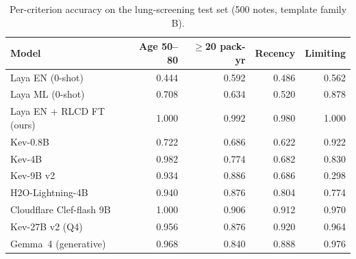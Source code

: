 \begin{table}[t]\centering\small
\caption{Per-criterion accuracy on the lung-screening test set (500 notes, template family B).}\label{tab:crit}
\begin{tabular}{lrrrr}\toprule Model & Age 50--80 & $\geq$20 pack-yr & Recency & Limiting \\ \midrule
Laya EN (0-shot) & 0.444 & 0.592 & 0.486 & 0.562 \\
Laya ML (0-shot) & 0.708 & 0.634 & 0.520 & 0.878 \\
Laya EN + RLCD FT (ours) & 1.000 & 0.992 & 0.980 & 1.000 \\
Kev-0.8B & 0.722 & 0.686 & 0.622 & 0.922 \\
Kev-4B & 0.982 & 0.774 & 0.682 & 0.830 \\
Kev-9B v2 & 0.934 & 0.886 & 0.686 & 0.298 \\
H2O-Lightning-4B & 0.940 & 0.876 & 0.804 & 0.774 \\
Cloudflare Clef-flash 9B & 1.000 & 0.906 & 0.912 & 0.970 \\
Kev-27B v2 (Q4) & 0.956 & 0.876 & 0.920 & 0.964 \\
Gemma~4 (generative) & 0.968 & 0.840 & 0.888 & 0.976 \\
\bottomrule\end{tabular}\end{table}